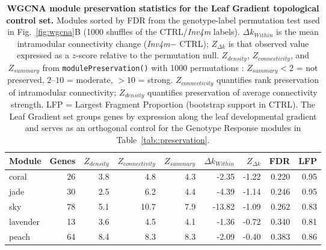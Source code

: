 \documentclass[9pt,twocolumn,twoside]{rilabRxiv}
\newcommand{\invfour}{\textit{Inv4m}\xspace}
\begin{document}
\begin{table}[!ht]
\caption{\textbf{WGCNA module preservation statistics for the Leaf Gradient topological control set.} Modules sorted by FDR from the genotype-label permutation test used in Fig.~\ref{fig:wgcna}B (1000 shuffles of the CTRL/\invfour labels). $\Delta k_{Within}$ is the mean intramodular connectivity change (\invfour $-$ CTRL); $Z_{\Delta k}$ is that observed value expressed as a $z$-score relative to the permutation null. $Z_{density}$, $Z_{connectivity}$, and $Z_{summary}$ from \texttt{modulePreservation()} with 1000 permutations \cite{langfelder2011}: $Z_{summary} < 2$ = not preserved, $2$--$10$ = moderate, $> 10$ = strong. $Z_{connectivity}$ quantifies rank preservation of intramodular connectivity; $Z_{density}$ quantifies preservation of average connectivity strength. LFP = Largest Fragment Proportion (bootstrap support in CTRL). The Leaf Gradient set groups genes by expression along the leaf developmental gradient and serves as an orthogonal control for the Genotype Response modules in Table~\ref{tab::preservation}.}
\label{tab::preservation_lg}
\centering
\small
\begin{tabular}{@{}lrrrrrrrr@{}}
\toprule
\textbf{Module} & \textbf{Genes} & \textbf{$Z_{density}$} & \textbf{$Z_{connectivity}$} & \textbf{$Z_{summary}$} & \textbf{$\Delta k_{Within}$} & \textbf{$Z_{\Delta k}$} & \textbf{FDR} & \textbf{LFP} \\
\midrule
coral & 26 & 3.8 & 4.8 & 4.3 & -2.35 & -1.22 & 0.220 & 0.95 \\
jade & 30 & 2.5 & 6.2 & 4.4 & -4.39 & -1.14 & 0.246 & 0.95 \\
sky & 78 & 5.1 & 10.7 & 7.9 & -13.82 & -1.09 & 0.262 & 0.83 \\
lavender & 13 & 3.6 & 4.5 & 4.1 & -1.36 & -0.72 & 0.340 & 0.81 \\
peach & 64 & 8.4 & 8.3 & 8.3 & -2.09 & -0.40 & 0.383 & 0.86 \\
\bottomrule
\end{tabular}
\end{table}
\end{document}
